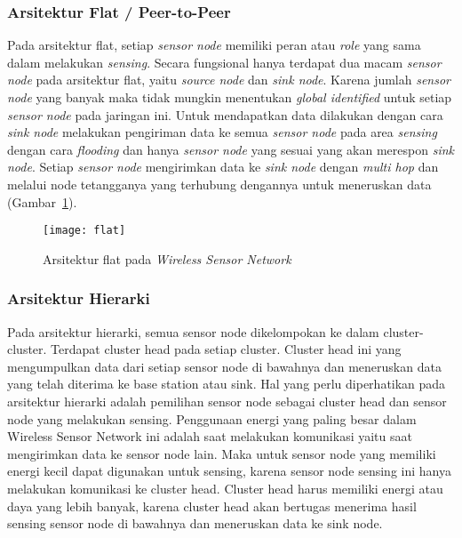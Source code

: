 \subsubsection{Arsitektur Flat / Peer-to-Peer}
Pada arsitektur flat, setiap \textit{sensor node} memiliki peran atau \textit{role} yang sama dalam melakukan \textit{sensing}. Secara fungsional hanya terdapat dua macam \textit{sensor node} pada arsitektur flat, yaitu \textit{source node} dan \textit{sink node}. Karena jumlah \textit{sensor node} yang banyak maka tidak mungkin menentukan \textit{global identified} untuk setiap \textit{sensor node} pada jaringan ini. Untuk mendapatkan data dilakukan dengan cara \textit{sink node} melakukan pengiriman data ke semua \textit{sensor node} pada area \textit{sensing} dengan cara \textit{flooding} dan hanya \textit{sensor node} yang sesuai yang akan merespon \textit{sink node}. Setiap \textit{sensor node} mengirimkan data ke \textit{sink node} dengan \textit{multi hop} dan melalui node tetangganya yang terhubung dengannya untuk meneruskan data (Gambar~\ref{fig:flat}).
\begin{figure} [H]
	\centering  
	\texttt{[image: flat]}  
	\caption[Arsitektur flat pada \textit{Wireless Sensor Network}]{Arsitektur flat pada \textit{Wireless Sensor Network}} 
	\label{fig:flat} 
\end{figure} 

\subsubsection{Arsitektur Hierarki}
Pada arsitektur hierarki, semua sensor node dikelompokan ke dalam cluster-cluster. Terdapat cluster head pada setiap cluster. Cluster head ini yang mengumpulkan data dari setiap sensor node di bawahnya dan meneruskan data yang telah diterima ke base station atau sink. Hal yang perlu diperhatikan pada arsitektur hierarki adalah pemilihan sensor node sebagai cluster head dan sensor node yang melakukan sensing. Penggunaan energi yang paling besar dalam Wireless Sensor Network ini adalah saat melakukan komunikasi yaitu saat mengirimkan data ke sensor node lain. Maka untuk sensor node yang memiliki energi kecil dapat digunakan untuk sensing, karena sensor node sensing ini hanya melakukan komunikasi ke cluster head. Cluster head harus memiliki energi atau daya yang lebih banyak, karena cluster head akan bertugas menerima hasil sensing sensor node di bawahnya dan meneruskan data ke sink node. 

